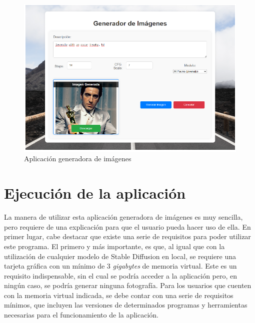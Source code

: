 \begin{figure}[!htb]
	\centering
	\includegraphics[width = 0.8
	\textwidth]{Imagenes/Vectorial/genapp.png}
	\caption{Aplicación generadora de imágenes}
	\label{fig:appgen}
\end{figure}


\section{Ejecución de la aplicación}

La manera de utilizar esta aplicación generadora de imágenes es muy sencilla, pero requiere de una explicación para que el usuario pueda hacer uso de ella. En primer lugar, cabe destacar que existe una serie de requisitos para poder utilizar este programa. El primero y más importante, es que, al igual que con la utilización de cualquier modelo de Stable Diffusion en local, se requiere una tarjeta gráfica con un mínimo de 3 \textit{gigabytes} de memoria virtual. Este es un requisito indispensable, sin el cual se podría acceder a la aplicación pero, en ningún caso, se podría generar ninguna fotografía. Para los usuarios que cuenten con la memoria virtual indicada, se debe contar con una serie de requisitos mínimos, que incluyen las versiones de determinados programas y herramientas necesarias para el funcionamiento de la aplicación.\\

